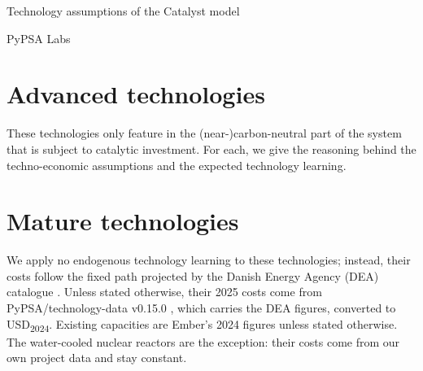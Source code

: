 \documentclass[11pt,a4paper]{article}
\begin{document}
\begin{center}
{\LARGE Technology assumptions of the Catalyst model\par}\vspace{4pt}
{PyPSA Labs\par}
\end{center}
\vspace{-3mm}

{\scriptsize\setlength{\tabcolsep}{2pt}\renewcommand{\arraystretch}{1.55}

}

\clearpage

\setlength{\parindent}{0pt}
\setlength{\parskip}{0.5\baselineskip plus 1pt}

\section{Advanced technologies}
These technologies only feature in the (near-)carbon-neutral part of the system that is subject to catalytic investment.
For each, we give the reasoning behind the techno-economic assumptions and the expected technology learning.








\section{Mature technologies}
We apply no endogenous technology learning to these technologies; instead, their costs follow the fixed path projected by the Danish Energy Agency (DEA) catalogue \citep{dea}.
Unless stated otherwise, their 2025 costs come from PyPSA/technology-data v0.15.0 \citep{technologydata}, which carries the DEA figures, converted to USD\textsubscript{2024}.
Existing capacities are Ember's 2024 figures \citep{ember2025} unless stated otherwise.
The water-cooled nuclear reactors are the exception: their costs come from our own project data and stay constant.

















\printbibliography
\end{document}
